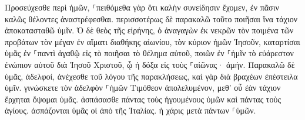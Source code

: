 \documentclass{openreader}
\begin{document}
Προσεύχεσθε περὶ ἡμῶν, ⸀πειθόμεθα γὰρ ὅτι καλὴν συνείδησιν ἔχομεν, ἐν πᾶσιν καλῶς θέλοντες ἀναστρέφεσθαι. 
περισσοτέρως δὲ παρακαλῶ τοῦτο ποιῆσαι ἵνα τάχιον ἀποκατασταθῶ ὑμῖν. 
Ὁ δὲ θεὸς τῆς εἰρήνης, ὁ ἀναγαγὼν ἐκ νεκρῶν τὸν ποιμένα τῶν προβάτων τὸν μέγαν ἐν αἵματι διαθήκης αἰωνίου, τὸν κύριον ἡμῶν Ἰησοῦν, 
καταρτίσαι ὑμᾶς ἐν ⸀παντὶ ἀγαθῷ εἰς τὸ ποιῆσαι τὸ θέλημα αὐτοῦ, ποιῶν ἐν ⸀ἡμῖν τὸ εὐάρεστον ἐνώπιον αὐτοῦ διὰ Ἰησοῦ Χριστοῦ, ᾧ ἡ δόξα εἰς τοὺς ⸀αἰῶνας· ἀμήν. 
Παρακαλῶ δὲ ὑμᾶς, ἀδελφοί, ἀνέχεσθε τοῦ λόγου τῆς παρακλήσεως, καὶ γὰρ διὰ βραχέων ἐπέστειλα ὑμῖν. 
γινώσκετε τὸν ἀδελφὸν ⸀ἡμῶν Τιμόθεον ἀπολελυμένον, μεθ’ οὗ ἐὰν τάχιον ἔρχηται ὄψομαι ὑμᾶς. 
ἀσπάσασθε πάντας τοὺς ἡγουμένους ὑμῶν καὶ πάντας τοὺς ἁγίους. ἀσπάζονται ὑμᾶς οἱ ἀπὸ τῆς Ἰταλίας. 
ἡ χάρις μετὰ πάντων ⸀ὑμῶν. 
\end{document}

